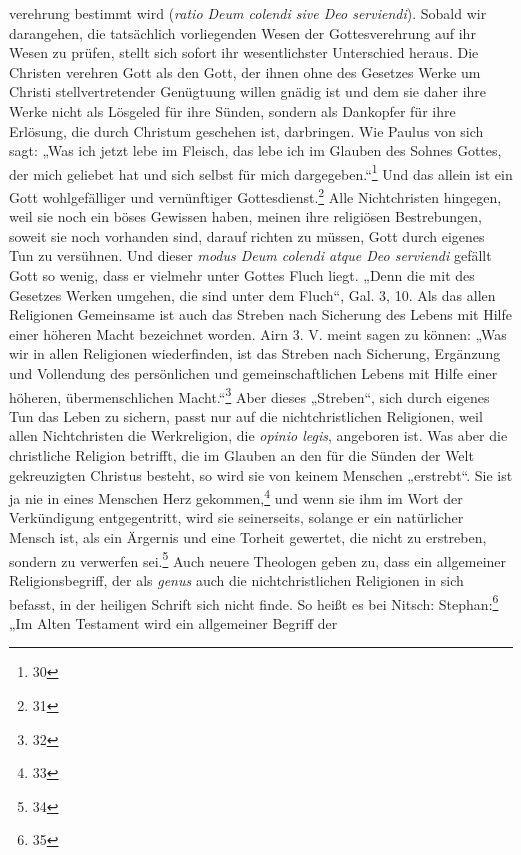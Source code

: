 verehrung bestimmt wird (\textit{ratio Deum colendi sive Deo serviendi}). Sobald wir darangehen, die tatsächlich vorliegenden Wesen der Gottesverehrung auf ihr Wesen zu prüfen, stellt sich sofort ihr wesentlichster Unterschied heraus. Die Christen verehren Gott als den Gott, der ihnen ohne des Gesetzes Werke um Christi stellvertretender Genügtuung willen gnädig ist und dem sie daher ihre Werke nicht als Lösgeled für ihre Sünden, sondern als Dankopfer für ihre Erlösung, die durch Christum geschehen ist, darbringen. Wie Paulus von sich sagt: „Was ich jetzt lebe im Fleisch, das lebe ich im Glauben des Sohnes Gottes, der mich geliebet hat und sich selbst für mich dargegeben.“\footnote{30} Und das allein ist ein Gott wohlgefälliger und vernünftiger Gottesdienst.\footnote{31} Alle Nichtchristen hingegen, weil sie noch ein böses Gewissen haben, meinen ihre religiösen Bestrebungen, soweit sie noch vorhanden sind, darauf richten zu müssen, Gott durch eigenes Tun zu versühnen. Und dieser \textit{modus Deum colendi atque Deo serviendi} gefällt Gott so wenig, dass er vielmehr unter Gottes Fluch liegt. „Denn die mit des Gesetzes Werken umgehen, die sind unter dem Fluch“, Gal. 3, 10.
Als das allen Religionen Gemeinsame ist auch das Streben nach Sicherung des Lebens mit Hilfe einer höheren Macht bezeichnet worden. {\sc Airn} 3. V. meint sagen zu können: „Was wir in allen Religionen wiederfinden, ist das Streben nach Sicherung, Ergänzung und Vollendung des persönlichen und gemeinschaftlichen Lebens mit Hilfe einer höheren, übermenschlichen Macht.“\footnote{32} Aber dieses „Streben“, sich durch eigenes Tun das Leben zu sichern, passt nur auf die nichtchristlichen Religionen, weil allen Nichtchristen die Werkreligion, die \textit{opinio legis}, angeboren ist. Was aber die christliche Religion betrifft, die im Glauben an den für die Sünden der Welt gekreuzigten Christus besteht, so wird sie von keinem Menschen „erstrebt“. Sie ist ja nie in eines Menschen Herz gekommen,\footnote{33} und wenn sie ihm im Wort der Verkündigung entgegentritt, wird sie seinerseits, solange er ein natürlicher Mensch ist, als ein Ärgernis und eine Torheit gewertet, die nicht zu erstreben, sondern zu verwerfen sei.\footnote{34} Auch neuere Theologen geben zu, dass ein allgemeiner Religionsbegriff, der als \textit{genus} auch die nichtchristlichen Religionen in sich befasst, in der heiligen Schrift sich nicht finde. So heißt es bei {\sc Nitsch}: {\sc Stephan}:\footnote{35} „Im Alten Testament wird ein allgemeiner Begriff der